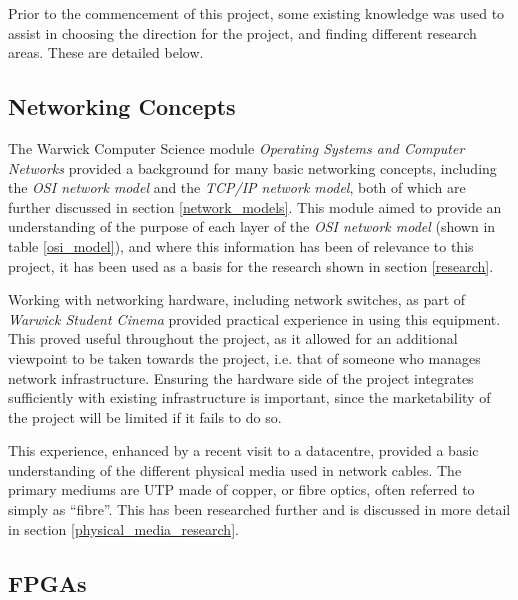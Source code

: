 Prior to the commencement of this project, some existing knowledge was used to assist in choosing the direction for the project, and finding different research areas. These are detailed below.

\subsection{Networking Concepts}
\label{networking_concepts_introduction}
The Warwick Computer Science module \textit{Operating Systems and Computer Networks} \cite{cs241} provided a background for many basic networking concepts, including the \textit{OSI network model} and the \textit{TCP/IP network model}, both of which are further discussed in section \ref{network_models}. This module aimed to provide an understanding of the purpose of each layer of the \textit{OSI network model} (shown in table \ref{osi_model}), and where this information has been of relevance to this project, it has been used as a basis for the research shown in section \ref{research}.

Working with networking hardware, including network switches, as part of \textit{Warwick Student Cinema} \cite{wsc} provided practical experience in using this equipment. This proved useful throughout the project, as it allowed for an additional viewpoint to be taken towards the project, i.e. that of someone who manages network infrastructure.
Ensuring the hardware side of the project integrates sufficiently with existing infrastructure is important, since the marketability of the project will be limited if it fails to do so.

This experience, enhanced by a recent visit to a datacentre, provided a basic understanding of the different physical media used in network cables. The primary mediums are UTP made of copper, or fibre optics, often referred to simply as ``fibre''. This has been researched further and is discussed in more detail in section \ref{physical_media_research}.






\subsection{FPGAs}
\label{fpgas}

